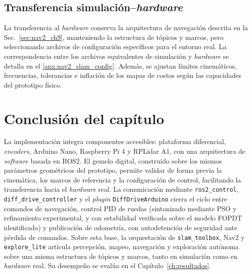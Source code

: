 \subsection{Transferencia simulación--\texorpdfstring{\textit{hardware}}{hardware}}
\label{sec:integracion_ciclo}

La transferencia al \textit{hardware} conserva la arquitectura de navegación
descrita en la Sec.~\ref{sec:nav2_ch9}, manteniendo la estructura de tópicos
y marcos, pero seleccionando archivos de configuración específicos para el
entorno real. La correspondencia entre los archivos equivalentes de
simulación y \textit{hardware} se detalla en el \ref{anx:nav2_slam_config}. Además, se ajustan límites cinemáticos,
frecuencias, tolerancias e inflación de los mapas de costos según las
capacidades del prototipo físico.

\section*{Conclusión del capítulo}
\label{sec:conclusion_ch9}

La implementación integra componentes accesibles: plataforma diferencial, \textit{encoders}, \gls{Arduino} Nano, Raspberry Pi 4 y RPLidar A1, con una arquitectura de \textit{software} basada en \gls{ROS2}. El gemelo digital, construido sobre los mismos parámetros geométricos del prototipo, permite validar de forma previa la cinemática, los marcos de referencia y la configuración de control, facilitando la transferencia hacia el \textit{hardware} real. La comunicación mediante \texttt{ros2\_control}, \texttt{diff\_drive\_controller} y el \textit{plugin} \texttt{DiffDriveArduino} cierra el ciclo entre comandos de navegación, control PID de ruedas (sintonizado mediante PSO y refinamiento experimental, y con estabilidad verificada sobre el modelo FOPDT identificado) y publicación de odometría, con autodetención de seguridad ante pérdida de comandos. Sobre esta base, la orquestación de \texttt{slam\_toolbox}, Nav2 y \texttt{explore\_lite} articula percepción, mapeo, navegación y exploración autónoma sobre una misma estructura de tópicos y marcos, tanto en simulación como en \textit{hardware} real. Su desempeño se evalúa en el Capítulo~\ref{ch:resultados}.
